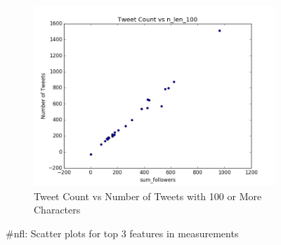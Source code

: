 \documentclass[12pt]{article}
\begin{document}
\begin{figure}[H]
\begin{subfigure}{.45\textwidth}
\includegraphics[width=\textwidth]{figures/count_vs_n_len_100_tweets_nfl.png}
\caption{Tweet Count vs Number of Tweets with 100 or More Characters }
\label{part1:fig:LC}
\end{subfigure}

\caption{\#nfl: Scatter plots for top 3 features in measurements}
\label{part1:fig}
\end{figure}
\end{document}
